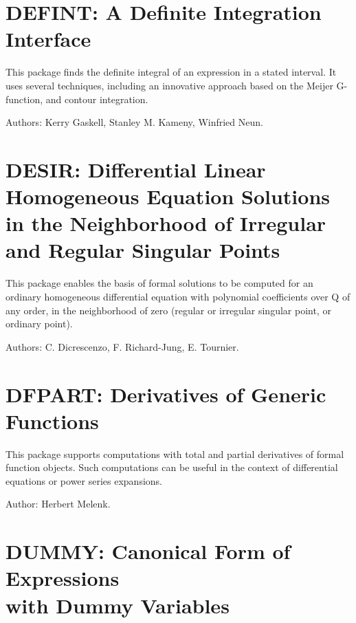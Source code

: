 \section{DEFINT: A Definite Integration Interface}
\label{DEFINT}

This package finds the definite integral of an expression in a stated
interval.  It uses several techniques, including an innovative approach
based on the Meijer G-function, and contour integration.

Authors: Kerry Gaskell, Stanley M. Kameny, Winfried Neun.


\fi

\newpage

\section{DESIR: Differential Linear Homogeneous Equation Solutions in the
              Neighborhood of Irregular and Regular Singular Points}

This package enables the basis of formal solutions to be computed for an
ordinary homogeneous differential equation with polynomial coefficients
over Q of any order, in the neighborhood of zero (regular or irregular
singular point, or ordinary point).

Authors: C. Dicrescenzo, F. Richard-Jung, E. Tournier.



\newpage

\section{DFPART: Derivatives of Generic Functions}

This package supports computations with total and partial derivatives of
formal function objects.  Such computations can be useful in the context
of differential equations or power series expansions.

Author: Herbert Melenk.



\newpage

\section{DUMMY: Canonical Form of Expressions \texorpdfstring{\\}{} with Dummy Variables}

